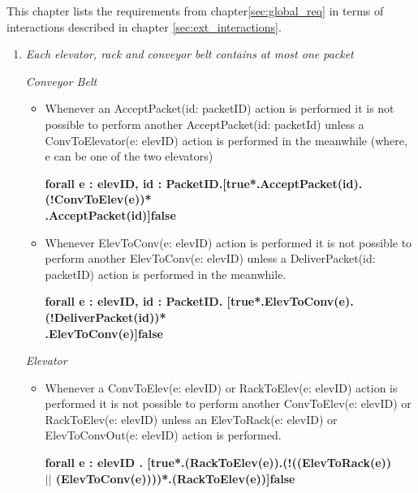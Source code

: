 
This chapter lists the requirements from chapter\ref{sec:global_req} in terms of interactions described in chapter \ref{sec:ext_interactions}.

\begin{enumerate}
\item \textit{Each elevator, rack and conveyor belt contains at most one packet}

	\textit{Conveyor Belt}
	\begin{itemize}
	\item
	Whenever an AcceptPacket(id: packetID) action is performed it
	is not possible to perform another AcceptPacket(id:
	packetId) unless a ConvToElevator(e: elevID) action is
	performed in the meanwhile (where, e can be one of the two elevators)
	
	\textbf{
	forall e : elevID, id : PacketID.[true*.AcceptPacket(id).(!ConvToElev(e))*\\.AcceptPacket(id)]false}
	
	
	\item Whenever ElevToConv(e: elevID) action is performed it is
	not possible to perform another ElevToConv(e: 
	elevID) unless a DeliverPacket(id: packetID) action is performed in the meanwhile.
	
	\textbf{forall e : elevID, id : PacketID. [true*.ElevToConv(e).(!DeliverPacket(id))*\\.ElevToConv(e)]false}
	\end{itemize}
	
	\textit{Elevator}
	\begin{itemize}
	\item Whenever a ConvToElev(e: elevID) or RackToElev(e: elevID) 
	action is performed it is not possible to perform another
	ConvToElev(e: elevID) or RackToElev(e: elevID) unless an 
	ElevToRack(e: elevID) or ElevToConvOut(e: elevID) action is performed.
	
	\textbf{forall e : elevID . [true*.(RackToElev(e)).(!((ElevToRack(e))\\ $||$ (ElevToConv(e))))*.(RackToElev(e))]false
	}
	

\end{itemize}
\end{enumerate}
